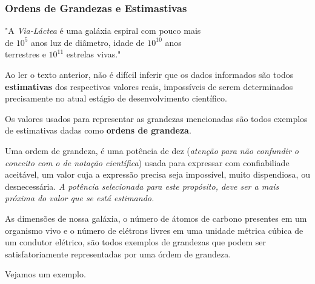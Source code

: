 \documentclass[a4paper, 11pt]{report}
\begin{document}
\subsubsection{Ordens de Grandezas e Estimastivas}

\begin{flushright}
    "A \emph{Via-Láctea} é uma galáxia espiral com pouco mais \\
    de $10^5$ anos luz de diâmetro, idade de $10^{10}$ anos \\
    terrestres e $10^{11}$ estrelas vivas." 
\end{flushright}

Ao ler o texto anterior, não é difícil inferir que os dados informados são todos
\textbf{estimativas} dos respectivos valores reais, impossíveis de serem 
determinados precisamente no atual estágio de desenvolvimento científico. 

Os valores usados para representar as grandezas mencionadas são todos exemplos de 
estimativas dadas como \textbf{ordens de grandeza}. 

Uma ordem de grandeza, é uma potência de dez (\emph{atenção para não confundir
o conceito com o de notação científica}) usada para expressar com confiabiliade 
aceitável, um valor cuja a expressão precisa seja impossível, muito dispendiosa, 
ou desnecessária. \emph{A potência selecionada para este propósito, deve ser a mais
próxima do valor que se está estimando.} 

As dimensões de nossa galáxia, o número de átomos de carbono presentes em um 
organismo vivo e o número de elétrons livres em uma unidade métrica cúbica de 
um condutor elétrico, são todos exemplos de grandezas que podem ser 
satisfatoriamente representadas por uma órdem de grandeza. 

Vejamos um exemplo.
\end{document}
